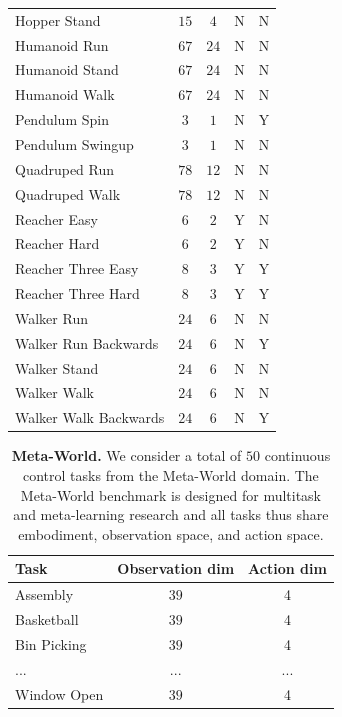 \documentclass{article}
\begin{document}
\begin{table}[h!]
{\begin{tabular}{lcccc}
Hopper Stand & $15$ & $4$ & N & N \\
Humanoid Run & $67$ & $24$ & N & N \\
Humanoid Stand & $67$ & $24$ & N & N \\
Humanoid Walk & $67$ & $24$ & N & N \\
Pendulum Spin & $3$ & $1$ & N & Y \\
Pendulum Swingup & $3$ & $1$ & N & N \\
Quadruped Run & $78$ & $12$ & N & N \\
Quadruped Walk & $78$ & $12$ & N & N \\
Reacher Easy & $6$ & $2$ & Y & N \\
Reacher Hard & $6$ & $2$ & Y & N \\
Reacher Three Easy & $8$ & $3$ & Y & Y \\
Reacher Three Hard & $8$ & $3$ & Y & Y \\
Walker Run & $24$ & $6$ & N & N \\
Walker Run Backwards & $24$ & $6$ & N & Y \\
Walker Stand & $24$ & $6$ & N & N \\
Walker Walk & $24$ & $6$ & N & N \\
Walker Walk Backwards & $24$ & $6$ & N & Y \\ \bottomrule
\end{tabular}%
}
\vspace{-0.1in}
\end{table}

\begin{table}[h!]
\centering
\parbox{\textwidth}{
\caption{\textbf{Meta-World.} We consider a total of $50$ continuous control tasks from the Meta-World domain. The Meta-World benchmark is designed for multitask and meta-learning research and all tasks thus share embodiment, observation space, and action space.}
\label{tab:appendix-metaworld-tasks}
\centering
\vspace{-0.05in}
\begin{tabular}{lcc}
\toprule
\textbf{Task} & \textbf{Observation dim} & \textbf{Action dim} \\ \midrule
Assembly & $39$ & 4 \\
Basketball & $39$ & 4 \\ 
Bin Picking & $39$ & 4 \\ 
... & ... & ... \\ 
Window Open & $39$ & 4 \\ \bottomrule
\end{tabular}%
}
\vspace{-0.1in}
\end{table}
\end{document}
